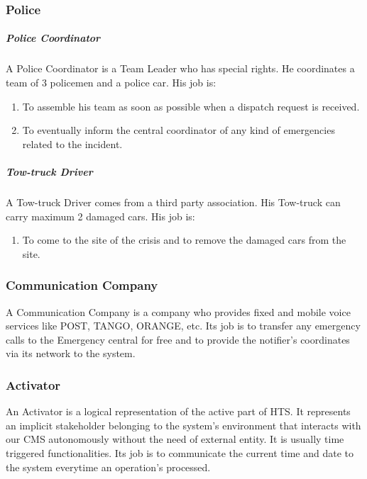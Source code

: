\subsubsection{Police}

\subparagraph{Police Coordinator}
A Police Coordinator is a Team Leader who has special
rights. He coordinates a team of 3 policemen and a police car.
His job is:

\begin{enumerate}
\item To assemble his team as soon as possible when a dispatch request is
received.
\item To eventually inform the central coordinator of any
kind of emergencies related to the incident.
\end{enumerate}

\subparagraph{Tow-truck Driver}
A Tow-truck Driver comes from a third party association. His Tow-truck can carry
maximum 2 damaged cars.
His job is:

\begin{enumerate}
  \item To come to the site of the crisis and to remove the damaged cars from
  the site.
\end{enumerate}


\subsubsection{Communication Company}
A Communication Company is a company who provides fixed and mobile voice
services like POST, TANGO, ORANGE, etc. Its job is to transfer any emergency
calls to the Emergency central for free and to provide the notifier's
coordinates via its network to the system.


\subsubsection{Activator}
An Activator is a logical representation of the active part of HTS. It
represents an implicit stakeholder belonging to the system's environment that interacts with
our CMS autonomously without the need of external entity. It is usually time triggered
functionalities. Its job is to communicate the current time and date to the
system everytime an operation's processed.


